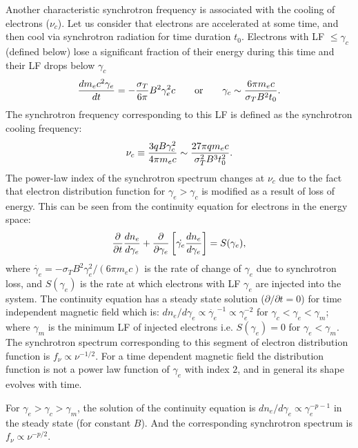 \documentclass[12pt,a4paper]{article}
\begin{document}
Another characteristic synchrotron frequency is associated with the
cooling of electrons ($\nu_c$). Let us consider that electrons are
accelerated at some time, and then cool via synchrotron radiation
for time duration $t_0$. Electrons with LF $\leqslant \gamma_c$ 
(defined below) lose a significant fraction of their energy 
during this time and their LF drops below $\gamma_c$
\begin{equation}
   {d m_e c^2 \gamma_e \over dt} = - {\sigma_T\over 6\pi} B^2 
    \gamma_e^2 c \quad\quad {\rm or} \quad \quad \gamma_c \sim 
    {6\pi m_e c\over \sigma_T B^2 t_0}.
  \label{gam_c}
\end{equation}
The synchrotron frequency corresponding to this LF is defined as
the synchrotron cooling frequency:
\begin{equation}
   \nu_c \equiv {3 q B \gamma_c^2\over 4\pi m_e c} \sim 
       {27 \pi q m_e c\over \sigma_T^2 B^3 t_0^2}.
  \label{nu_c}
\end{equation}
The power-law index of the synchrotron spectrum changes at $\nu_c$ due to the fact that electron distribution function for $\gamma_e >\gamma_c$ is modified as a result of loss of energy. This can be seen from the continuity equation for electrons in the energy space:
\begin{equation}
    {\partial \over \partial t}{d n_e\over d\gamma_e} + {\partial 
    \over \partial \gamma_e} \left[ \dot{\gamma_e} {d n_e\over 
   d\gamma_e}\right] = S(\gamma_e),
\end{equation}
where $\dot{\gamma_e} = - \sigma_T B^2 \gamma_e^2/(6\pi m_e c)$ is the rate of change of $\gamma_e$ due to synchrotron loss, and $S(\gamma_e)$ is the rate at which electrons with LF $\gamma_e$ are injected into the system. The continuity equation has a steady state solution ($\partial/\partial t = 0$) for time independent magnetic field which is: $d n_e/d\gamma_e\propto \dot{\gamma_e}^{-1} \propto \gamma_e^{-2}$ for $\gamma_c < \gamma_e < \gamma_m$; where $\gamma_m$ is the minimum LF of injected electrons i.e. $S(\gamma_e) = 0$ for $\gamma_e < \gamma_m$. The synchrotron spectrum corresponding to this segment of electron distribution function is $f_\nu \propto \nu^{-1/2}$. For a time dependent magnetic field the distribution function is not a power law function of $\gamma_e$ with index $2$, and in general its shape evolves with time.

For $\gamma_e > \gamma_c > \gamma_m$, the solution of the continuity equation is $d n_e/d\gamma_e \propto \gamma_e^{-p-1}$ in the steady state (for constant $B$). And the corresponding synchrotron spectrum is $f_\nu \propto \nu^{-p/2}$.
\end{document}
